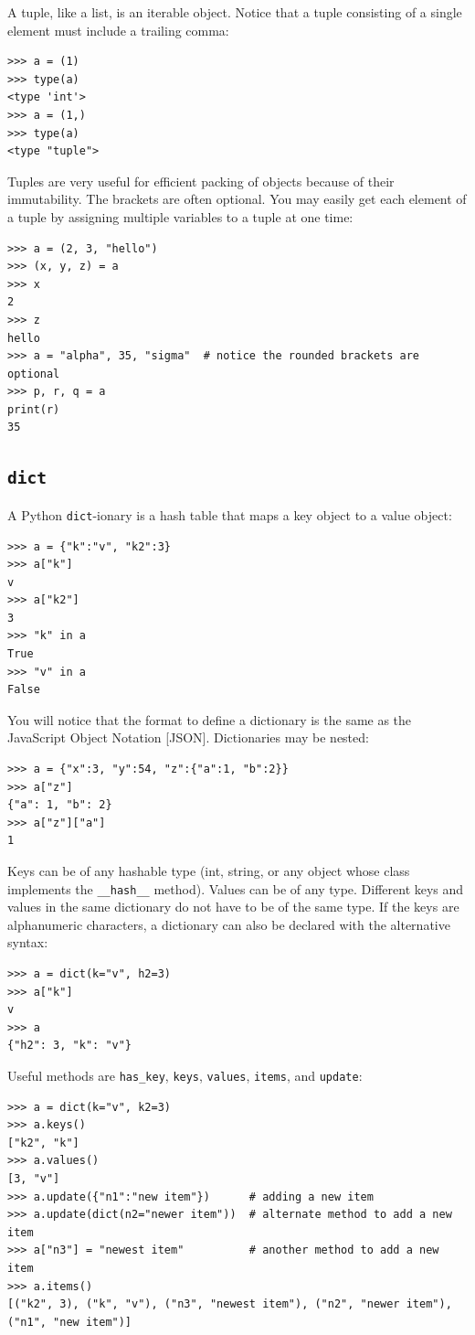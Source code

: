 \documentclass[justified, sixbynine]{tufte-book}
\def\ft{\small\tt}
\theoremstyle{plain}%
\newtheorem * {corollary}{Corollary}
\theoremstyle{definition}
\theoremstyle{remark}
\newtheorem * {remark}{Remark}
\newtheorem * {note}{Note}
\begin{document}
\begin{fullwidth}
A tuple, like a list, is an iterable object. Notice that a tuple consisting of a single element must include a trailing comma:
\begin{lstlisting}
>>> a = (1)
>>> type(a)
<type 'int'>
>>> a = (1,)
>>> type(a)
<type "tuple">
\end{lstlisting}

Tuples are very useful for efficient packing of objects because of their immutability. The brackets are often optional.  You may easily get each element of a tuple by assigning multiple variables to a tuple at one time:
\begin{lstlisting}
>>> a = (2, 3, "hello")
>>> (x, y, z) = a
>>> x
2
>>> z
hello
>>> a = "alpha", 35, "sigma"  # notice the rounded brackets are optional
>>> p, r, q = a
print(r)
35
\end{lstlisting}

\goodbreak\subsection{{\ft dict}}


A Python {\ft dict}-ionary is a hash table that maps a key object to a value object:
\begin{lstlisting}
>>> a = {"k":"v", "k2":3}
>>> a["k"]
v
>>> a["k2"]
3
>>> "k" in a
True
>>> "v" in a
False
\end{lstlisting}

You will notice that the format to define a dictionary is the same as the JavaScript Object Notation [JSON].  Dictionaries may be nested:
\begin{lstlisting}
>>> a = {"x":3, "y":54, "z":{"a":1, "b":2}}
>>> a["z"]
{"a": 1, "b": 2}
>>> a["z"]["a"]
1
\end{lstlisting}

Keys can be of any hashable type (int, string, or any object whose class implements the {\ft \_\_hash\_\_} method). Values can be of any type. Different keys and values in the same dictionary do not have to be of the same type. If the keys are alphanumeric characters, a dictionary can also be declared with the alternative syntax:
\begin{lstlisting}
>>> a = dict(k="v", h2=3)
>>> a["k"]
v
>>> a
{"h2": 3, "k": "v"}
\end{lstlisting}

Useful methods are {\ft has\_key}, {\ft keys}, {\ft values}, {\ft items}, and {\ft update}:
\begin{lstlisting}
>>> a = dict(k="v", k2=3)
>>> a.keys()
["k2", "k"]
>>> a.values()
[3, "v"]
>>> a.update({"n1":"new item"})      # adding a new item
>>> a.update(dict(n2="newer item"))  # alternate method to add a new item
>>> a["n3"] = "newest item"          # another method to add a new item
>>> a.items()
[("k2", 3), ("k", "v"), ("n3", "newest item"), ("n2", "newer item"), ("n1", "new item")]
\end{lstlisting}


\end{fullwidth}
\end{document}

